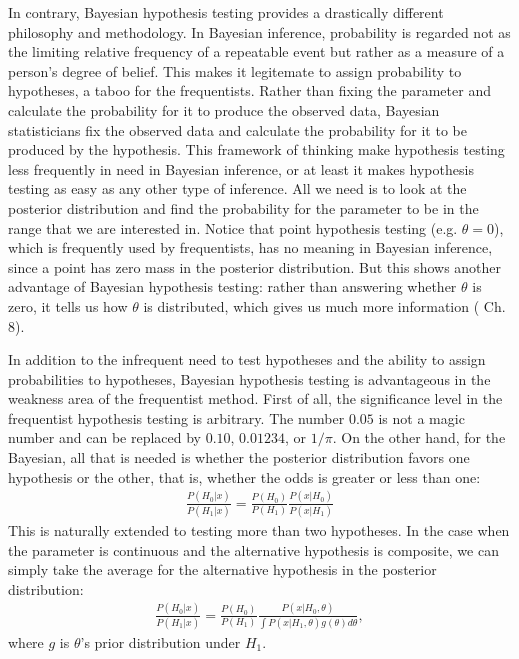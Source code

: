\message{ !name(biostat830_literatureReview.tex)}\documentclass[12pt]{article} \usepackage[nolists]{endfloat}
\begin{document}
In contrary, Bayesian hypothesis testing provides a drastically
different philosophy and methodology.  In Bayesian inference,
probability is regarded not as the limiting relative frequency of a
repeatable event but rather as a measure of a person's degree of
belief.  This makes it legitemate to assign probability to hypotheses,
a taboo for the frequentists.  Rather than fixing the parameter and
calculate the probability for it to produce the observed data,
Bayesian statisticians fix the observed data and calculate the
probability for it to be produced by the hypothesis.  This framework
of thinking make hypothesis testing less frequently in need in
Bayesian inference, or at least it makes hypothesis testing as easy as
any other type of inference.  All we need is to look at the posterior
distribution and find the probability for the parameter to be in the
range that we are interested in.  Notice that point hypothesis testing
(e.g. $\theta = 0$), which is frequently used by frequentists, has no
meaning in Bayesian inference, since a point has zero mass in the
posterior distribution.  But this shows another advantage of Bayesian
hypothesis testing: rather than answering whether $\theta$ is zero, it
tells us how $\theta$ is distributed, which gives us much more
information (\cite{gelman} Ch. 8).

In addition to the infrequent need to test hypotheses and the ability
to assign probabilities to hypotheses, Bayesian hypothesis testing is
advantageous in the weakness area of the frequentist method.  First of
all, the significance level in the frequentist hypothesis testing is
arbitrary. The number $0.05$ is not a magic number and can be replaced
by $0.10$, $0.01234$, or $1/\pi$.  On the other hand, for the
Bayesian, all that is needed is whether the posterior distribution
favors one hypothesis or the other, that is, whether the odds is
greater or less than one:
\begin{align*}
  \frac{P(H_0 | x)}{P(H_1 | x)} = \frac{P(H_0)}{P(H_1)} \frac{P(x | H_0)}{P(x | H_1)}
\end{align*}
This is naturally extended to testing more than two hypotheses.
In the case when the parameter is continuous and the alternative hypothesis is composite,
we can simply take the average for the alternative hypothesis in the posterior distribution:
\begin{align*}
  \frac{P(H_0 | x)}{P(H_1 | x)} = \frac{P(H_0)}{P(H_1)} \frac{P(x | H_0, \theta)}{\int P(x | H_1, \theta) g(\theta) d\theta},
\end{align*}
where $g$ is $\theta$'s prior distribution under $H_1$.
  
\end{document}
